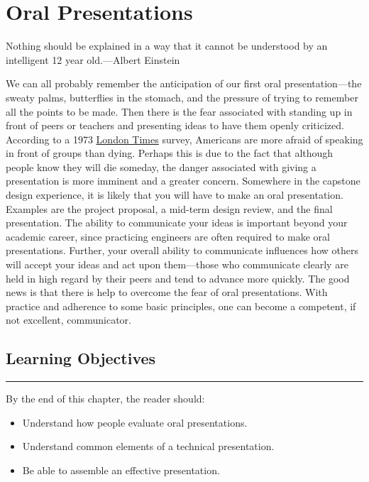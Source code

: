 \chapter{Oral Presentations}
\label{chapter:oralPresentations}
\graphicspath{ {./chapter12/Fig} }

\begin{itquote}
Nothing should be explained in a way that it cannot be understood by an
intelligent 12 year old.---Albert Einstein
\end{itquote}

We can all probably remember the anticipation of our first oral
presentation---the sweaty palms, butterflies in the stomach, and the
pressure of trying to remember all the points to be made. Then there is
the fear associated with standing up in front of peers or teachers and
presenting ideas to have them openly criticized. According to a 1973
\ul{London Times} survey, Americans are more afraid of speaking in front
of groups than dying. Perhaps this is due to the fact that although
people know they will die someday, the danger associated with giving a
presentation is more imminent and a greater concern. Somewhere in the
capstone design experience, it is likely that you will have to make an
oral presentation. Examples are the project proposal, a mid-term design
review, and the final presentation. The ability to communicate your
ideas is important beyond your academic career, since practicing
engineers are often required to make oral presentations. Further, your
overall ability to communicate influences how others will accept your
ideas and act upon them---those who communicate clearly are held in high
regard by their peers and tend to advance more quickly. The good news is
that there is help to overcome the fear of oral presentations. With
practice and adherence to some basic principles, one can become a
competent, if not excellent, communicator.

\section*{Learning Objectives}
\noindent\rule{\linewidth}{1pt}
By the end of this chapter, the reader should:

\begin{itemize}
\item
  Understand how people evaluate oral presentations.
\item
  Understand common elements of a technical presentation.
\item
  Be able to assemble an effective presentation.
\end{itemize}

